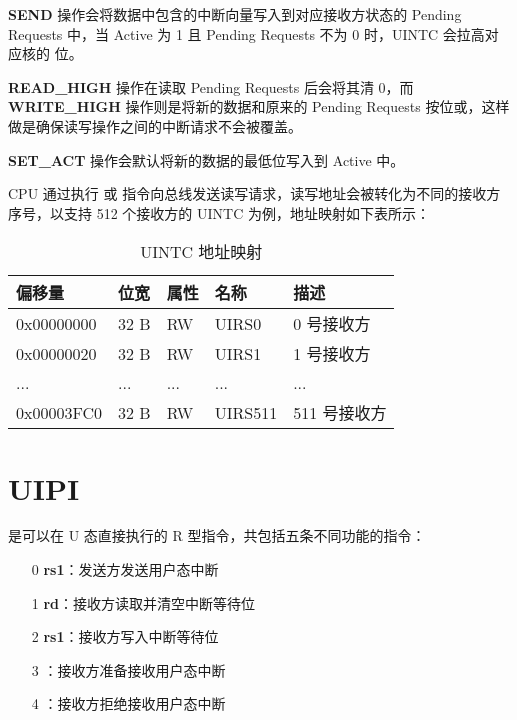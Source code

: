 \textbf{SEND} 操作会将数据中包含的中断向量写入到对应接收方状态的 Pending Requests 中，当 Active 为 1 且 Pending Requests 不为 0 时，UINTC 会拉高对应核的 \FcsrUipUsip 位。

\textbf{READ\_HIGH} 操作在读取 Pending Requests 后会将其清 0，而 \textbf{WRITE\_HIGH} 操作则是将新的数据和原来的 Pending Requests 按位或，这样做是确保读写操作之间的中断请求不会被覆盖。

\textbf{SET\_ACT} 操作会默认将新的数据的最低位写入到 Active 中。

CPU 通过执行 \Isd 或 \Ild 指令向总线发送读写请求，读写地址会被转化为不同的接收方序号，以支持 512 个接收方的 UINTC 为例，地址映射如下表所示：

\begin{table}
    \centering
    \begin{threeparttable}[c]
        \label{tab:three-part-table-5}
        \begin{tabular}{|l|l|l|l|l|}
            \hline
            偏移量 & 位宽 & 属性 & 名称 & 描述 \\
            \hline
            0x00000000 & 32 B & RW & UIRS0 & 0 号接收方 \\
            \hline
            0x00000020 & 32 B & RW & UIRS1 & 1 号接收方 \\
            \hline
            ... & ... & ... & ... & ... \\
            \hline
            0x00003FC0 & 32 B & RW & UIRS511 & 511 号接收方 \\
            \hline
        \end{tabular}
        \caption{UINTC 地址映射}
    \end{threeparttable}
\end{table}

\section{UIPI}

\Iuipi 是可以在 U 态直接执行的 R 型指令，共包括五条不同功能的指令：

\begin{itemize}
    \item[0] \textbf{\Iuipisend rs1}：发送方发送用户态中断
    \item[1] \textbf{\Iuipiread rd}：接收方读取并清空中断等待位
    \item[2] \textbf{\Iuipiwrite rs1}：接收方写入中断等待位
    \item[3] \textbf{\Iuipiact}：接收方准备接收用户态中断
    \item[4] \textbf{\Iuipideact}：接收方拒绝接收用户态中断
\end{itemize}

